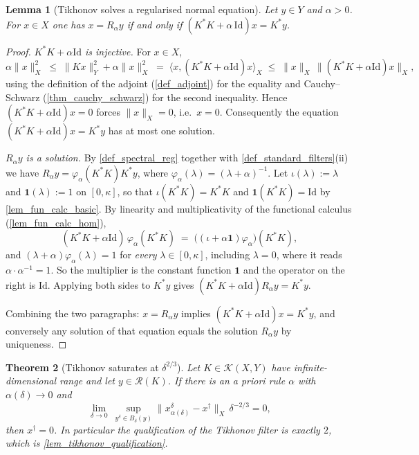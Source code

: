 \documentclass[a4paper]{report}
\theoremstyle{plain}
\newtheorem{theorem}{Theorem}[chapter]
\newtheorem{lemma}[theorem]{Lemma}
\theoremstyle{definition}
\theoremstyle{remark}
\newcommand{\Kk}{\mathcal{K}}
\newcommand{\Ran}{\mathcal{R}}
\newcommand{\Id}{\mathrm{Id}}
\newcommand{\dg}{^{\dagger}}
\begin{document}
\begin{lemma}[Tikhonov solves a regularised normal equation]
  \label{lem_tikhonov_normal}
  Let $y \in Y$ and $\alpha > 0$.  For $x \in X$ one has $x = R_{\alpha}y$ if and only if
  $(K^{*}K + \alpha\,\Id)x = K^{*}y$.
\end{lemma}

\begin{proof}
  \emph{$K^{*}K + \alpha\Id$ is injective.}  For $x \in X$,
  \[
    \alpha\|x\|_X^{2} \;\le\; \|Kx\|_Y^{2} + \alpha\|x\|_X^{2}
      \;=\; \langle x, (K^{*}K + \alpha\Id)x\rangle_X
      \;\le\; \|x\|_X\,\|(K^{*}K+\alpha\Id)x\|_X ,
  \]
  using the definition of the adjoint (\cref{def_adjoint}) for the equality and
  Cauchy--Schwarz (\cref{thm_cauchy_schwarz}) for the second inequality.  Hence
  $(K^{*}K+\alpha\Id)x = 0$ forces $\|x\|_X = 0$, i.e.\ $x = 0$.  Consequently the
  equation $(K^{*}K + \alpha\Id)x = K^{*}y$ has at most one solution.

  \emph{$R_{\alpha}y$ is a solution.}  By \cref{def_spectral_reg} together with
  \cref{def_standard_filters}(ii) we have $R_{\alpha}y = \varphi_{\alpha}(K^{*}K)K^{*}y$,
  where $\varphi_{\alpha}(\lambda) = (\lambda+\alpha)^{-1}$.  Let $\iota(\lambda) := \lambda$
  and $\mathbf{1}(\lambda) := 1$ on $[0,\kappa]$, so that $\iota(K^{*}K) = K^{*}K$ and
  $\mathbf{1}(K^{*}K) = \Id$ by \cref{lem_fun_calc_basic}.  By linearity and
  multiplicativity of the functional calculus (\cref{lem_fun_calc_hom}),
  \[
    (K^{*}K + \alpha\Id)\,\varphi_{\alpha}(K^{*}K)
      \;=\; \bigl((\iota + \alpha\mathbf{1})\varphi_{\alpha}\bigr)(K^{*}K) ,
  \]
  and $(\lambda + \alpha)\varphi_{\alpha}(\lambda) = 1$ for \emph{every} $\lambda \in
  [0,\kappa]$, including $\lambda = 0$, where it reads $\alpha\cdot\alpha^{-1} = 1$.  So
  the multiplier is the constant function $\mathbf{1}$ and the operator on the right is
  $\Id$.  Applying both sides to $K^{*}y$ gives $(K^{*}K+\alpha\Id)R_{\alpha}y = K^{*}y$.

  Combining the two paragraphs: $x = R_{\alpha}y$ implies $(K^{*}K+\alpha\Id)x = K^{*}y$,
  and conversely any solution of that equation equals the solution $R_{\alpha}y$ by
  uniqueness.
\end{proof}


\begin{theorem}[Tikhonov saturates at $\delta^{2/3}$]
  \label{thm_tikhonov_saturation}
  Let $K \in \Kk(X,Y)$ have infinite-dimensional range and let $y \in \Ran(K)$.  If there
  is an a priori rule $\alpha$ with $\alpha(\delta) \to 0$ and
  \[
    \lim_{\delta \to 0}\ \sup_{y^{\delta} \in B_{\delta}(y)}
      \|x^{\delta}_{\alpha(\delta)} - x\dg\|_X\,\delta^{-2/3} = 0 ,
  \]
  then $x\dg = 0$.  In particular the qualification of the Tikhonov filter is exactly $2$,
  which is \cref{lem_tikhonov_qualification}.
\end{theorem}
\end{document}
